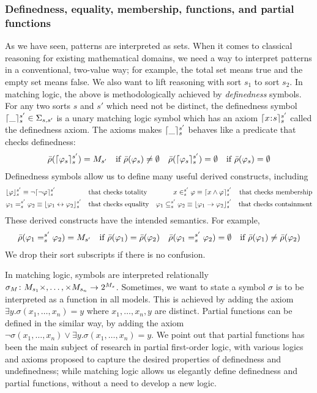 \documentclass{amsart}
\begin{document}
\subsubsection{Definedness, equality, membership, functions, and partial 
functions}

As we have seen, patterns are interpreted as sets.
When it comes to classical reasoning for existing mathematical domains,
we need a way to interpret patterns in a conventional, two-value way;
for example, the total set means true and the empty set means false.
We also want to lift reasoning with sort $s_1$ to sort $s_2$.
In matching logic, the above is methodologically achieved by
\emph{definedness} symbols.
For any two sorts $s$ and $s'$ which need not be distinct, 
the definedness symbol
$\lceil\_\rceil_{s}^{s'} \in \Sigma_{s,s'}$
is a unary matching logic symbol which has an axiom
$
\lceil x \mathbin{\!:\!} s\rceil_{s}^{s'}
$
called the definedness axiom. 
The axioms makes $\lceil\_\rceil_{s}^{s'}$ behaves like a predicate
that checks definedness:
\begin{align*}
& \bar{\rho}(\lceil\varphi_s\rceil_{s}^{s'}) = M_{s'}
  \quad \text{if $\bar{\rho}(\varphi_s) \neq \emptyset$}
& \bar{\rho}(\lceil\varphi_s\rceil_{s}^{s'}) = \emptyset
  \quad \text{if $\bar{\rho}(\varphi_s) = \emptyset$}
\end{align*}
Definedness symbols allow us to define many useful derived constructs, including\begin{align*}
&\lfloor\varphi\rfloor_s^{s'} \equiv \neg \lceil\neg \varphi\rceil_s^{s'}
&& \text{that checks totality}
&x \in_s^{s'} \varphi \equiv \lceil x \wedge \varphi\rceil_s^{s'}
&& \text{that checks membership}
\\
&\varphi_1 =_s^{s'} \varphi_2 \equiv \lfloor\varphi_1 \leftrightarrow \varphi_2\rfloor_s^{s'}
&& \text{that checks equality}
&\varphi_1 \subseteq_s^{s'} \varphi_2 
\equiv \lfloor\varphi_1 \to \varphi_2\rfloor_s^{s'}
&& \text{that checks containment}
\end{align*}
These derived constructs have the intended semantics.
For example,
\begin{align*}
& \bar{\rho}(\varphi_1 =_{s}^{s'} \varphi_2) = M_{s'}
  \quad \text{if $\bar{\rho}(\varphi_1) = \bar{\rho}(\varphi_2)$}
& \bar{\rho}(\varphi_1 =_{s}^{s'} \varphi_2) = \emptyset
  \quad \text{if $\bar{\rho}(\varphi_1) \neq \bar{\rho}(\varphi_2)$}
\end{align*}
We drop their sort subscripts if there is no confusion.

In matching logic, symbols are interpreted relationally
$\sigma_M \colon M_{s_1} \times ,\dots, \times M_{s_n} \to 2^{M_s}$.
Sometimes, we want to state a symbol $\sigma$ is to be interpreted
as a function in all models.
This is achieved by adding the axiom
$\exists y . \sigma(x_1 ,\dots, x_n) = y$
where $x_1 ,\dots, x_n , y$ are distinct.
Partial functions can be defined in the similar way, by adding the axiom
$\neg \sigma(x_1 ,\dots, x_n) \vee \exists y . \sigma(x_1 ,\dots, x_n) = y$.
We point out that partial functions has been the main subject of research
in partial first-order logic, with various logics and axioms proposed
to capture the desired properties of definedness and undefinedness;
while matching logic allows us elegantly define definedness and partial 
functions, without a need to develop a new logic.
\end{document}
